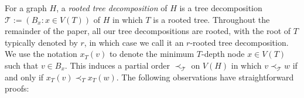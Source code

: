 \documentclass[kpfonts]{patmorin}
\newcommand{\defin}[1]{\emph{\color{brightmaroon}#1}}
\DeclareMathOperator{\pw}{pw}
\theoremstyle{named}
\begin{document}
%
%
%



For a graph $H$, a \defin{rooted tree decomposition} of $H$ is a tree decomposition $\mathcal{T}:=(B_x:x\in V(T))$ of $H$ in which $T$ is a rooted tree.  Throughout the remainder of the paper, all our tree decompositions are rooted, with the root of $T$ typically denoted by $r$, in which case we call it an $r$-rooted tree decomposition.  We use the notation $x_T(v)$ to denote the minimum $T$-depth node $x\in V(T)$ such that $v\in B_x$.  This induces a partial order $\prec_{\mathcal{T}}$ on $V(H)$ in which $v\prec_{\mathcal{T}} w$ if and only if $x_T(v)\prec_T x_T(w)$.  The following observations have straightforward proofs:
\end{document}
